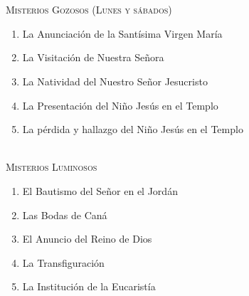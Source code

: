 \documentclass[9pt]{article}
\date{Valladolid (España), \monthyeardate\today}
\begin{document}
\begin{multicols*}{2}

    
    \vspace{1mm}
    \\[2mm]
    \\[1mm]
    \\[1mm]
    \\[1mm]
    \\
    
    \\

    \small{}\\
    \textsc{Misterios Gozosos (Lunes y sábados)}
    \begin{enumerate}
        \item La Anunciación de la Santísima Virgen María
        \item La Visitación de Nuestra Señora
        \item La Natividad del Nuestro Señor Jesucristo
        \item La Presentación del Niño Jesús en el Templo
        \item La pérdida y hallazgo del Niño Jesús en el Templo
    \end{enumerate}

    \vspace{2mm}

    \small{}\\
    \textsc{Misterios Luminosos}
    \begin{enumerate}
        \item El Bautismo del Señor en el Jordán
        \item Las Bodas de Caná
        \item El Anuncio del Reino de Dios
        \item La Transfiguración
        \item La Institución de la Eucaristía
    \end{enumerate}

    \vspace{2mm}


\end{multicols*}
\end{document}
